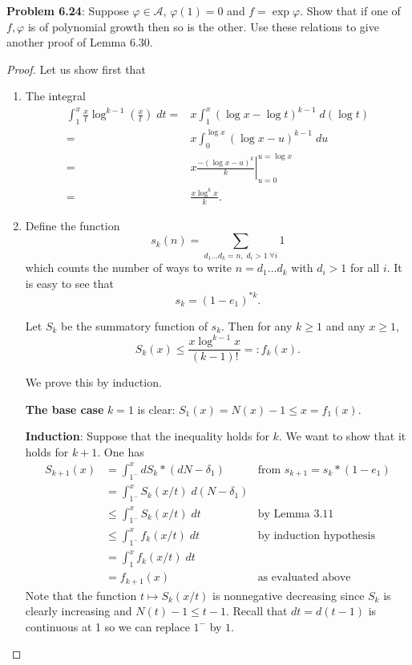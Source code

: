 \documentclass[12pt]{article}
\newcommand{\A}{\mathcal{A}}
\begin{document}
\fi

\textbf{Problem 6.24}: Suppose $\varphi \in \A$, $\varphi(1) = 0$ and $f = \exp \varphi$. Show that if one of $f, \varphi$ is of polynomial growth then so is the other. Use these relations to give another proof of Lemma 6.30.

\begin{proof}
Let us show first that
\begin{enumerate}
\item The integral
\begin{align*}
\int_1^x \frac{x}{t} \log^{k-1}\left(\frac{x}{t}\right) \; dt
=& x \int_1^x (\log x - \log t)^{k-1} \; d(\log t)\\
=& x \int_0^{\log x} (\log x - u)^{k-1} \; du\\
=& x \left. \frac{-(\log x - u)^{k}}{k} \right|_{u=0}^{u=\log x}\\
=& \frac{x \log^k x}{k}.
\end{align*}

\item Define the function
$$s_k(n) = \sum_{d_1 ... d_k = n, \; d_i > 1 \; \forall i} 1$$ which counts the number of ways to write $n = d_1 ... d_k$ with $d_i > 1$ for all $i$. It is easy to see that
$$s_k = (1 - e_1)^{*k}.$$

Let $S_k$ be the summatory function of $s_k$. Then for any $k \geq 1$ and any $x \geq 1$,
$$S_k(x) \leq \frac{x \log^{k-1} x}{(k-1)!} =: f_k(x).$$

We prove this by induction.

\textbf{The base case} $k = 1$ is clear: $S_1(x) = N(x) - 1 \leq x = f_1(x)$.

\textbf{Induction}: Suppose that the inequality holds for $k$. We want to show that it holds for $k + 1$. One has
\begin{align*}
S_{k+1}(x) &= \int_{1^-}^x d S_k * (d N - \delta_1) &\text{from } s_{k+1} = s_k * (1 - e_1)\\
&= \int_{1^-}^x S_k(x/t) \; d (N - \delta_1) \\
&\leq \int_{1^-}^x S_k(x/t) \; dt &\text{by Lemma 3.11} \\
&\leq \int_{1^-}^x f_k(x/t) \; dt &\text{by induction hypothesis}\\
&= \int_1^x f_k(x/t) \; dt\\
&= f_{k+1}(x) &\text{as evaluated above}
\end{align*}
Note that the function $t \mapsto S_k(x/t)$ is nonnegative decreasing since $S_k$ is clearly increasing and $N(t) - 1 \leq t - 1$. Recall that $dt = d(t - 1)$ is continuous at 1 so we can replace $1^-$ by $1$.


\end{enumerate}
\end{proof}
\end{document}
